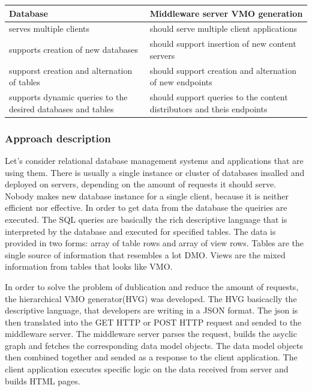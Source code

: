 \begin{center}
  \begin{tabular}{||p{3in}|||p{3in}||}
    \hline
    Database & Middleware server VMO generation  \\ \hline
    serves multiple clients & should serve multiple client applications  \\ \hline
    supports creation of new databases & should support insertion of new content servers  \\ \hline
    supporst creation and alternation of tables & should support creation and alternation of new endpoints  \\ \hline
    supports dynamic queries to the desired databases and tables & should support queries to the content distributors and theis endpoints \\ \hline
    \hline
  \end{tabular}
\end{center}

\subsubsection{Approach description}

Let's consider relational database management systems and applications that are using them. There is usually a single instance or cluster of databases insalled and deployed on servers, depending on the amount of requests it should serve. Nobody makes new database instance for a single client, because it is neither efficient nor effective. In order to get data from the database the queiries are executed. The SQL queries are basically the rich descriptive language that is interpreted by the database and executed for specified tables. The data is provided in two forms: array of table rows and array of view rows. Tables are the single source of information that resembles a lot DMO. Views are the mixed information from tables that looks like VMO. 

In order to solve the problem of dublication and reduce the amount of requests, the hierarchical VMO generator(HVG) was developed. The HVG basicaclly the descriptive language, that developers are writing in a JSON format. The json is then translated into the GET HTTP or POST HTTP request and sended  to the middleware server. The middleware server parses the request, builds the asyclic graph and fetches the corresponding data model objects. The data model objects then combined together and sended as a response to the client application. The client application executes specific logic on the data received from server and builds HTML pages.

